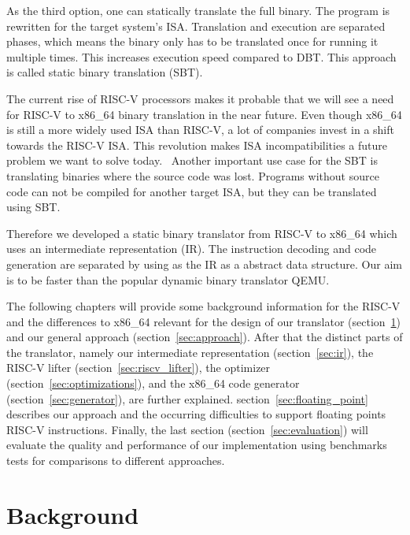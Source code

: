 \documentclass[course=eragp]{aspdoc}
\begin{document}
As the third option, one can statically translate the full binary. The program is rewritten for the
target system's ISA.
Translation and execution are separated phases, which means the binary only has to be translated once for
running it multiple times. This increases execution speed compared to DBT. This
approach is called static binary translation (SBT).~\cite{binary_translation}

\par

The current rise of RISC-V processors makes it probable that we will see a need for RISC-V to
x86\_64 binary translation in the near future. Even though x86\_64 is still a more widely used ISA
than RISC-V, a lot of companies invest in a shift towards the RISC-V ISA. This revolution makes ISA
incompatibilities a future problem we want to solve today.~\cite{riscv_rises} Another important use
case for the SBT is translating binaries where the source code was lost. Programs without source
code can not be compiled for another target ISA, but they can be translated using SBT.

\par

Therefore we developed a static binary translator from RISC-V to x86\_64 which uses an intermediate
representation (IR). The instruction decoding and code generation are separated by using as the IR
as a abstract data structure. Our aim is to be faster than the popular dynamic binary translator
QEMU.

\par

The following chapters will provide some background information for the RISC-V and the differences
to x86\_64 relevant for the design of our translator (section~\ref{sec:background}) and our general
approach (section~\ref{sec:approach}). After that the distinct parts of the translator, namely our
intermediate representation (section~\ref{sec:ir}), the RISC-V lifter
(section~\ref{sec:riscv_lifter}), the optimizer (section~\ref{sec:optimizations}), and the x86\_64
code generator (section~\ref{sec:generator}), are further explained.
section~\ref{sec:floating_point} describes our approach and the occurring difficulties to support
floating points RISC-V instructions. Finally, the last section (section~\ref{sec:evaluation}) will
evaluate the quality and performance of our implementation using benchmarks tests for comparisons to
different approaches.

\section{Background}\label{sec:background}
\end{document}
